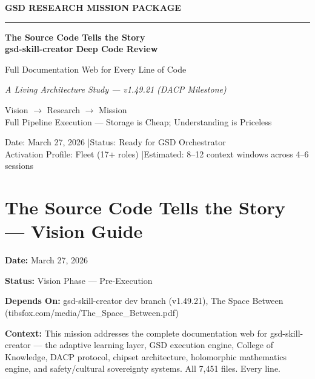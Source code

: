 \documentclass[11pt,letterpaper]{article}
\newcommand{\stageheader}[2]{%
  \noindent\colorbox{#2}{\makebox[\textwidth][l]{%
    \textcolor{white}{\bfseries\sffamily\hspace{6pt}#1\hspace{6pt}}}}%
  \vspace{0.5em}\par%
}
\newcommand{\metafield}[2]{\textbf{\sffamily #1} #2\par}
\begin{document}
\thispagestyle{empty}
\begin{center}
\vspace*{2.5cm}

{\small\sffamily\textcolor{primary}{\textbf{GSD RESEARCH MISSION PACKAGE}}}

\vspace{0.3cm}
\textcolor{bordergray}{\rule{8cm}{0.4pt}}

\vspace{1.5cm}
{\fontsize{26}{32}\selectfont\bfseries\sffamily\textcolor{primary}{The Source Code Tells the Story\\[0.3em]gsd-skill-creator Deep Code Review}}

\vspace{0.8cm}
{\Large\sffamily\textcolor{secondary}{Full Documentation Web for Every Line of Code}}

\vspace{0.5cm}
{\large\sffamily\itshape\textcolor{tertiary}{A Living Architecture Study — v1.49.21 (DACP Milestone)}}

\vspace{3cm}
{\sffamily\textcolor{accent}{Vision $\rightarrow$ Research $\rightarrow$ Mission}}\\[0.3em]
{\small\sffamily\textcolor{accent}{Full Pipeline Execution --- Storage is Cheap; Understanding is Priceless}}

\vspace{3cm}
{\small\sffamily\textcolor{subtlegray}{Date: March 27, 2026 \quad|\quad Status: Ready for GSD Orchestrator}}\\[0.3em]
{\small\sffamily\textcolor{subtlegray}{Activation Profile: Fleet (17+ roles) \quad|\quad Estimated: 8--12 context windows across 4--6 sessions}}
\end{center}
\newpage

\tableofcontents
\newpage

\stageheader{STAGE 1 --- VISION DOCUMENT}{primary}

\section{The Source Code Tells the Story --- Vision Guide}

\metafield{Date:}{March 27, 2026}
\metafield{Status:}{Vision Phase --- Pre-Execution}
\metafield{Depends On:}{gsd-skill-creator dev branch (v1.49.21), The Space Between (tibsfox.com/media/The\_Space\_Between.pdf)}
\metafield{Context:}{This mission addresses the complete documentation web for gsd-skill-creator --- the adaptive learning layer, GSD execution engine, College of Knowledge, DACP protocol, chipset architecture, holomorphic mathematics engine, and safety/cultural sovereignty systems. All 7,451 files. Every line.}
\end{document}
